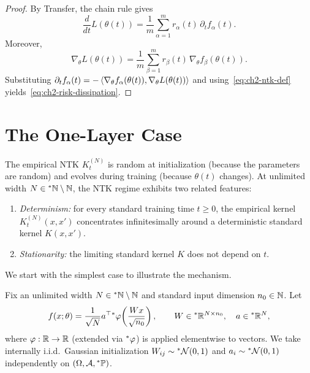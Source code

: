 \begin{proof}
By Transfer, the chain rule gives
\begin{equation}\label{eq:ch2-risk-diss-1}
\frac{d}{dt} L(\theta(t)) = \frac{1}{m} \sum_{\alpha=1}^{m} r_\alpha(t) \, \partial_t f_\alpha(t).
\end{equation}
Moreover,
\begin{equation}\label{eq:ch2-risk-diss-2}
\nabla_\theta L(\theta(t)) = \frac{1}{m} \sum_{\beta=1}^{m} r_\beta(t) \, \nabla_\theta f_\beta(\theta(t)).
\end{equation}
Substituting $\partial_t f_\alpha(t) = -\left\langle \nabla_\theta f_\alpha(\theta(t)), \nabla_\theta L(\theta(t)) \right\rangle$ and using~\eqref{eq:ch2-ntk-def} yields~\eqref{eq:ch2-risk-dissipation}.
\end{proof}

\section{The One-Layer Case}\label{sec:ch2-one-layer-ntk}

The empirical NTK $K_t^{(N)}$ is random at initialization (because the parameters are random) and evolves during training (because $\theta(t)$ changes). At unlimited width $N \in {}^*\mathbb{N} \setminus \mathbb{N}$, the NTK regime exhibits two related features:
\begin{enumerate}[label=(\roman*)]
\item \emph{Determinism:} for every standard training time $t \ge 0$, the empirical kernel $K_t^{(N)}(x, x')$ concentrates infinitesimally around a deterministic standard kernel $K(x, x')$.
\item \emph{Stationarity:} the limiting standard kernel $K$ does not depend on $t$.
\end{enumerate}
We start with the simplest case to illustrate the mechanism.

\begin{definition}\label{def:ch2-1layer-ntk}
Fix an unlimited width $N \in {}^*\mathbb{N} \setminus \mathbb{N}$ and standard input dimension $n_0 \in \mathbb{N}$. Let
\begin{equation}\label{eq:ch2-1layer-ntk-model}
f(x; \theta) = \frac{1}{\sqrt{N}} a^\top {}^*\varphi\!\left(\frac{Wx}{\sqrt{n_0}}\right), \qquad W \in {}^*\mathbb{R}^{N \times n_0}, \quad a \in {}^*\mathbb{R}^N,
\end{equation}
where $\varphi : \mathbb{R} \to \mathbb{R}$ (extended via ${}^*\varphi$) is applied elementwise to vectors. We take internally i.i.d.\ Gaussian initialization $W_{ij} \sim {}^*\mathcal{N}(0, 1)$ and $a_i \sim {}^*\mathcal{N}(0, 1)$ independently on $(\Omega, \mathcal{A}, {}^*\mathbb{P})$.
\end{definition}

